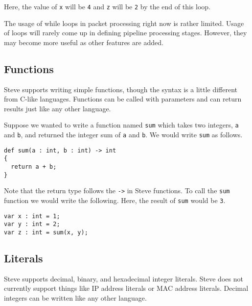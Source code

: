Here, the value of \texttt{x} will be \texttt{4} and \texttt{z} will be \texttt{2} by the end of this loop.

The usage of while loops in packet processing right now is rather limited. Usage of loops will rarely come up in defining pipeline processing stages. However, they may become more useful as other features are added.

\subsection{Functions} \label{tut:function}

Steve supports writing simple functions, though the syntax is a little different from C-like languages. Functions can be called with parameters and can return results just like any other language.

Suppose we wanted to write a function named \texttt{sum} which takes two integers, \texttt{a} and \texttt{b}, and returned the integer sum of \texttt{a} and \texttt{b}. We would write \texttt{sum} as follows.

\begin{codepage}
\begin{lstlisting}
def sum(a : int, b : int) -> int
{
  return a + b;
}
\end{lstlisting}
\end{codepage}

Note that the return type follows the \texttt{->} in Steve functions. To call the \texttt{sum} function we would write the following. Here, the result of \texttt{sum} would be \texttt{3}.

\begin{codepage}
\begin{lstlisting}
var x : int = 1;
var y : int = 2;
var z : int = sum(x, y);
\end{lstlisting}
\end{codepage}

\subsection{Literals} \label{tut:literal}


Steve supports decimal, binary, and hexadecimal integer literals. Steve does not currently support things like IP address literals or MAC address literals. Decimal integers can be written like any other language.


